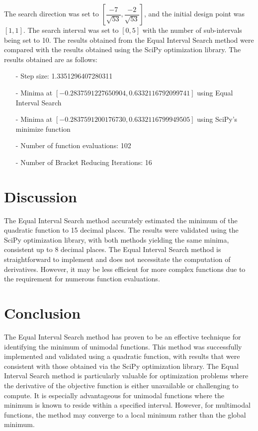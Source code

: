 \documentclass[11pt,a4paper]{article}
\begin{document}
The search direction was set to \(\left[\dfrac{-7}{\sqrt{53}}, \dfrac{-2}{\sqrt{53}}\right]\), and the initial design point was \([1, 1]\). The search interval was set to \([0, 5]\) with the number of sub-intervals being set to 10. The results obtained from the Equal Interval Search method were compared with the results obtained using the SciPy optimization library. The results obtained are as follows:
\begin{itemize}
    \item[-] Step size: 1.3351296407280311
    \item[-] Minima at \([-0.2837591227650904, 0.6332116792099741]\) using Equal Interval Search
    \item[-] Minima at \([-0.2837591200176730, 0.6332116799949505]\) using SciPy's minimize function
    \item[-] Number of function evaluations: 102
    \item[-] Number of Bracket Reducing Iterations: 16
\end{itemize}

\section{Discussion}
The Equal Interval Search method accurately estimated the minimum of the quadratic function to 15 decimal places. The results were validated using the SciPy optimization library, with both methods yielding the same minima, consistent up to 8 decimal places. The Equal Interval Search method is straightforward to implement and does not necessitate the computation of derivatives. However, it may be less efficient for more complex functions due to the requirement for numerous function evaluations. 

\section{Conclusion}
The Equal Interval Search method has proven to be an effective technique for identifying the minimum of unimodal functions. This method was successfully implemented and validated using a quadratic function, with results that were consistent with those obtained via the SciPy optimization library. The Equal Interval Search method is particularly valuable for optimization problems where the derivative of the objective function is either unavailable or challenging to compute. It is especially advantageous for unimodal functions where the minimum is known to reside within a specified interval. However, for multimodal functions, the method may converge to a local minimum rather than the global minimum.



\end{document}
